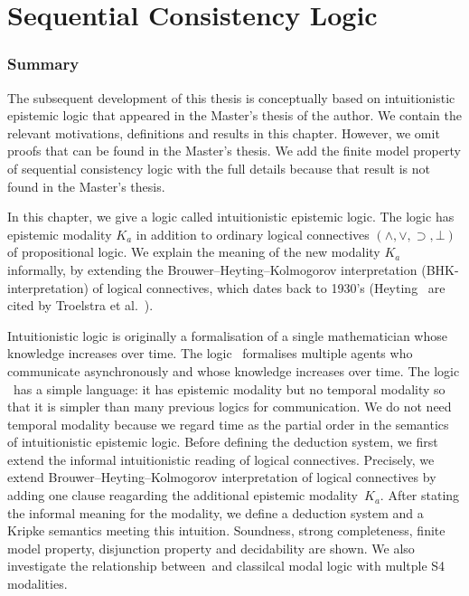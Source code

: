 \chapter{Sequential Consistency Logic}
\label{ch:seqcon}

  \subsection{Summary}

  The subsequent development of this thesis is conceptually based on
  intuitionistic epistemic logic that appeared in the Master's thesis
  of the author.
  We contain the relevant motivations, definitions and results in this chapter.
  However, we omit proofs that
  can be found in the Master's thesis.
  We add the finite model property of sequential consistency logic
  with the full details because that result is not found in the Master's thesis.

  In this chapter, we give a logic called intuitionistic epistemic logic.
  The logic has epistemic modality $K_a$ in addition to ordinary logical connectives
  $(\wedge, \vee, \supset, \bot)$ of propositional logic.
  We explain the meaning of the new modality $K_a$ informally, by extending
  the Brouwer--Heyting--Kolmogorov interpretation (BHK-interpretation) of logical
  connectives, which dates back to 1930's
  (Heyting~\cite{heyting1930formalen, heyting1931intuitionistische}
  are cited by Troelstra et al.~\cite{troelstra1988constructivism}).

  Intuitionistic logic is originally a formalisation of a single mathematician whose
  knowledge
  increases over time.  The logic \iec\, formalises multiple agents who communicate
  asynchronously and whose knowledge increases over time.
  The logic \iec\, has a simple language:
  it has epistemic modality but no temporal modality
  so that it is simpler than many previous logics for communication.
  We do not need temporal modality because
  we regard time as
  the partial order in the semantics of intuitionistic epistemic logic.
  Before defining the deduction system, we first extend the informal intuitionistic
  reading of logical connectives.
  Precisely,
  we extend Brouwer--Heyting--Kolmogorov interpretation of logical connectives
  by adding one clause reagarding the additional epistemic modality~$K_a$.
  After stating the informal meaning for the modality,
  we define a deduction system and a Kripke semantics meeting this intuition.
  Soundness, strong completeness, finite
  model property, disjunction property and decidability are
  shown.
  We also investigate the relationship between \iec\,and classilcal modal logic with multple
  S4 modalities.

